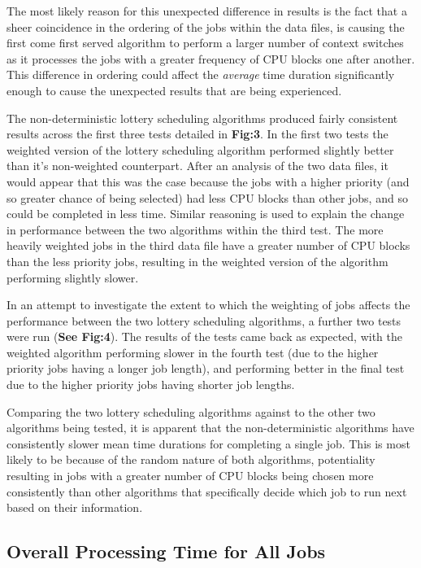 \documentclass{acm_proc_article-sp}
\begin{document}
The most likely reason for this unexpected difference in results is the fact that a sheer coincidence in the ordering of the jobs within the data files, is causing the first come first served algorithm to perform a larger number of context switches as it processes the jobs with a greater frequency of CPU blocks one after another. This difference in ordering could affect the \textit{average} time duration significantly enough to cause the unexpected results that are being experienced. 

The non-deterministic lottery scheduling algorithms produced fairly consistent results across the first three tests detailed in \textbf{Fig:3}. In the first two tests the weighted version of the lottery scheduling algorithm performed slightly better than it's non-weighted counterpart. After an analysis of the two data files, it would appear that this was the case because the jobs with a higher priority (and so greater chance of being selected) had less CPU blocks than other jobs, and so could be completed in less time. Similar reasoning is used to explain the change in performance between the two algorithms within the third test. The more heavily weighted jobs in the third data file have a greater number of CPU blocks than the less priority jobs, resulting in the weighted version of the algorithm performing slightly slower. 

In an attempt to investigate the extent to which the weighting of jobs affects the performance between the two lottery scheduling algorithms, a further two tests were run (\textbf{See Fig:4}). The results of the tests came back as expected, with the weighted algorithm performing slower in the fourth test (due to the higher priority jobs having a longer job length), and performing better in the final test due to the higher priority jobs having shorter job lengths.

Comparing the two lottery scheduling algorithms against to the other two algorithms being tested, it is apparent that the non-deterministic algorithms have consistently slower mean time durations for completing a single job. This is most likely to be because of the random nature of both algorithms, potentiality resulting in jobs with a greater number of CPU blocks being chosen more consistently than other algorithms that specifically decide which job to run next based on their information.

\vfill 

\subsection{Overall Processing Time for All Jobs}
\end{document}
